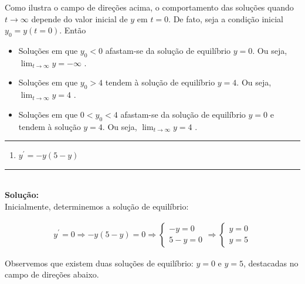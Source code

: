 \documentclass[twoside]{article}
\newcommand{\iniSol}{
    \noindent\textcolor{mainColor}{\rule{0.3\textwidth}{0.4pt}}\\
    \noindent\textcolor{mainColor}{\textbf{Solução:}}\\
}
\newcommand{\fimSol}{
    \hfill\fcolorbox{mainColor}{mainColor}

    
    \hfill\textcolor{mainColor}{\rule{0.3\textwidth}{0.4pt}}
}
\begin{document}
\begin{figure}[H]
\end{figure}

Como ilustra o campo de direções acima, o comportamento das soluções quando \(t \rightarrow \infty\) depende do valor inicial de \(y\) em \(t = 0\). De fato, seja a condição inicial \(y_0 = y(t=0)\). Então

\begin{itemize}
 \item Soluções em que $y_0 < 0$ afastam-se da solução de equilíbrio $y = 0$. Ou seja,   $\displaystyle \lim_{t \rightarrow \infty} y = -\infty$ . 
 \item Soluções em que $y_0 > 4$ tendem  à solução de equilíbrio $y = 4$. Ou seja,   $\displaystyle \lim_{t \rightarrow \infty} y = 4$ .
 \item Soluções em que $0 < y_0 < 4$ afastam-se da solução de equilíbrio $y = 0$ e tendem à solução $y = 4$. Ou seja,   $\displaystyle \lim_{t \rightarrow \infty} y = 4$ .
\end{itemize}

\fimSol

\begin{enumerate}[resume]
    \item $y^\prime = -y(5-y)$
\end{enumerate}

\iniSol

Inicialmente, determinemos a solução de equilíbrio:

\begin{align*}
    y^\prime = 0 \Rightarrow -y(5-y) = 0 \Rightarrow 
    \begin{cases}
      -y = 0\\
      5-y =0
    \end{cases}
    \Rightarrow
    \begin{cases}
        y=0\\
        y =5
    \end{cases}
\end{align*}

Observemos que existem duas soluções de equilíbrio: \(y = 0\) e \(y = 5\), destacadas no campo de direções abaixo.
\end{document}
